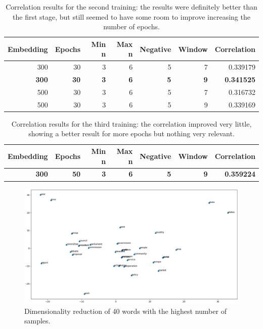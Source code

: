 \documentclass[11pt,oneside,a4paper]{article}
\begin{document}
\begin{table}[]
\centering
\begin{tabular}{@{}rrrrrrr@{}}
\toprule
Embedding & Epochs & Min n & Max n & Negative & Window & Correlation \\ \midrule
300 & 30 & 3 & 6 & 5 & 7 & 0.339179 \\
\textbf{300} & \textbf{30} & \textbf{3} & \textbf{6} & \textbf{5} & \textbf{9} & \textbf{0.341525} \\
500 & 30 & 3 & 6 & 5 & 7 & 0.316732 \\
500 & 30 & 3 & 6 & 5 & 9 & 0.339169 \\ \bottomrule
\end{tabular}
\caption{Correlation results for the second training: the results were definitely better than the first stage, but still seemed to have some room to improve increasing the number of epochs.}
\label{tab:second-training}
\end{table}

\begin{table}[]
\centering
\begin{tabular}{@{}rrrrrrr@{}}
\toprule
Embedding & Epochs & Min n & Max n & Negative & Window & Correlation \\ \midrule
\textbf{300} & \textbf{50} & \textbf{3} & \textbf{6} & \textbf{5} & \textbf{9} & \textbf{0.359224}
\end{tabular}
\caption{Correlation results for the third training: the correlation improved very little, showing a better result for more epochs but nothing very relevant.}
\label{tab:third-training}
\end{table}

\begin{figure}
  \includegraphics[scale=0.385]{pca.png}
  \centering
  \caption{Dimensionality reduction of 40 words with the highest number of samples.}
  \label{fig:pca}
\end{figure}
\end{document}
